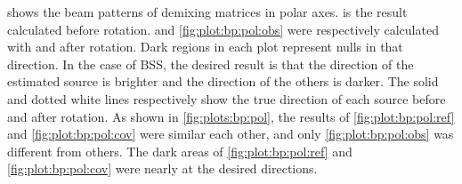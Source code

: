\documentclass[sip,biber]{now-journal}
\begin{document}
 shows the beam patterns of demixing matrices in polar axes.
 is the result calculated before rotation.
 and \cref{fig:plot:bp:pol:obs} were respectively calculated with \SFIIVAo{} and \SFIIVAm{} after rotation.
Dark regions in each plot represent nulls in that direction.
In the case of BSS, the desired result is that the direction of the estimated source is brighter and the direction of the others is darker.
The solid and dotted white lines respectively show the true direction of each source before and after rotation.
As shown in \cref{fig:plots:bp:pol}, the results of \cref{fig:plot:bp:pol:ref} and \cref{fig:plot:bp:pol:cov} were similar each other, and only \cref{fig:plot:bp:pol:obs} was different from others.
The dark areas of \cref{fig:plot:bp:pol:ref} and \cref{fig:plot:bp:pol:cov} were nearly at the desired directions.
\end{document}
